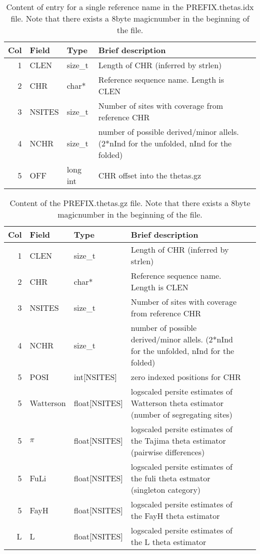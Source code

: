 \documentclass[10pt]{article}
\begin{document}
\begin{table}[ht]
\begin{tabular}{rllll}
  \hline
  {\bf Col} & {\bf Field} & {\bf Type} & {\bf Brief description} \\
  \hline
  1 & {\sf CLEN} & size\_t &  Length of CHR (inferred by strlen)\\
  2 & {\sf CHR} & char* & Reference sequence name. Length is CLEN\\
  3 & {\sf NSITES} & size\_t & Number of sites with coverage from reference CHR\\
  4 & {\sf NCHR} & size\_t & number of possible derived/minor allels. (2*nInd for the unfolded, nInd for the folded)\\
  5 & {\sf OFF} & long int & CHR offset into the thetas.gz \\
  \hline
\end{tabular}\label{thetaidx}
\caption{Content of entry for a single reference name in the PREFIX.thetas.idx file. Note that there exists a 8byte magicnumber in the beginning of the file.}
\end{table}

\begin{table}[h]
\begin{tabular}{rllll}
  \hline
  {\bf Col} & {\bf Field} & {\bf Type} & {\bf Brief description} \\
  \hline
  1 & {\sf CLEN} & size\_t &  Length of CHR (inferred by strlen)\\
  2 & {\sf CHR} & char* & Reference sequence name. Length is CLEN\\
  3 & {\sf NSITES} & size\_t & Number of sites with coverage from reference CHR\\
  4 & {\sf NCHR} & size\_t & number of possible derived/minor allels. (2*nInd for the unfolded, nInd for the folded)\\
  5 & {\sf POSI} & int[NSITES] & zero indexed positions for CHR \\
  5 & {\sf Watterson} & float[NSITES] & logscaled persite estimates of Watterson theta estimator (number of segregating sites) \\
  5 & {\sf $\pi$} & float[NSITES] & logscaled persite estimates of the Tajima theta estimator (pairwise differences) \\
  5 & {\sf FuLi} & float[NSITES] & logscaled persite estimates of the fuli theta estmator (singleton category) \\
  5 & {\sf FayH} & float[NSITES] & logscaled persite estimates of the FayH theta estimator\\
  L & {\sf L} & float[NSITES] & logscaled persite estimates of the L theta estimator  \\
  \hline
\end{tabular}\label{thetagz}
\caption{Content of the PREFIX.thetas.gz file. Note that there exists a 8byte magicnumber in the beginning of the file.}
\end{table}
\end{document}
